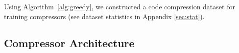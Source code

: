 Using Algorithm~\ref{alg:greedy}, we constructed a code compression dataset for training compressors (see dataset statistics in Appendix \ref{sec:stat}).
  





\subsection{Compressor Architecture}



